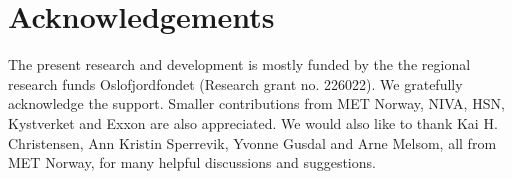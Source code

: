 \documentclass[12pt,a4paper,english]{article}
\begin{document}


\clearpage
\section*{\hspace{17mm}Acknowledgements}
The present research and development is mostly funded by the the regional research funds Oslofjordfondet (Research grant no. 226022). We gratefully acknowledge the support. Smaller contributions from MET Norway, NIVA, HSN, Kystverket and Exxon are also appreciated. We would also like to thank Kai H. Christensen, Ann Kristin Sperrevik, Yvonne Gusdal and Arne Melsom, all from MET Norway, for many helpful discussions and suggestions.   




\clearpage
\pagebreak



\clearpage
\pagebreak
 
\end{document}
